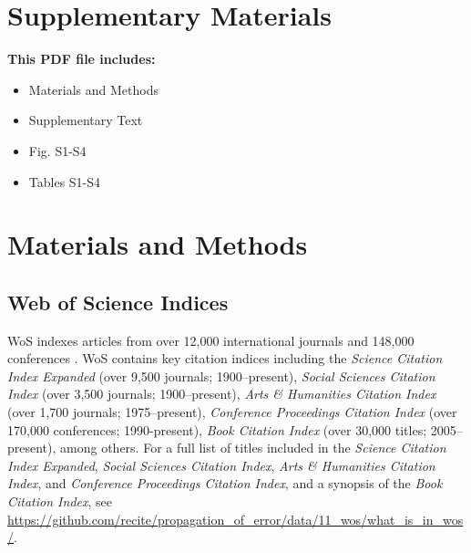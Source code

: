 \documentclass[12pt]{article}
\begin{document}

\clearpage

\appendix
\renewcommand\thesection{\arabic{section}}
\renewcommand\thetable{S\arabic{table}}  
\renewcommand\thefigure{S\arabic{figure}}
\setcounter{figure}{0}
\setcounter{section}{0}
\setcounter{table}{0}

\section*{Supplementary Materials}

\textbf{This PDF file includes:}
\begin{itemize}
\item Materials and Methods
\item Supplementary Text
\item Fig. S1-S4
\item Tables S1-S4
\end{itemize}

\section{Materials and Methods}

\subsection{Web of Science Indices}
\label{web_of_science}
WoS indexes articles from over 12,000 international journals and 148,000 conferences \cite{yong2013web}. WoS contains key citation indices including the \textit{Science Citation Index Expanded} (over 9,500 journals; 1900--present), \textit{Social Sciences Citation Index} (over 3,500 journals; 1900--present), \textit{Arts \& Humanities Citation Index} (over 1,700 journals; 1975--present), \textit{Conference Proceedings Citation Index} (over 170,000 conferences; 1990-present), \textit{Book Citation Index} (over 30,000 titles; 2005--present), among others. For a full list of titles included in the \textit{Science Citation Index Expanded}, \textit{Social Sciences Citation Index}, \textit{Arts \& Humanities Citation Index}, and \textit{Conference Proceedings Citation Index}, and a synopsis of the \textit{Book Citation Index}, see \url{https://github.com/recite/propagation\_of\_error/data/11\_wos/what\_is\_in\_wos/}.
\end{document}
